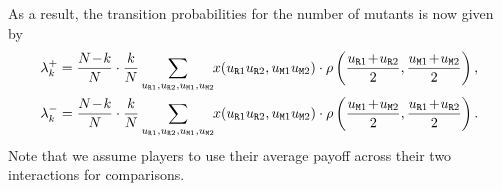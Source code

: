 \documentclass[11pt]{article}
\def\resident{\texttt{R}}
\def\mutant{\texttt{M}}
\theoremstyle{plainCl1}
\theoremstyle{plainCl2}
\begin{document}
\noindent
As a result, the transition probabilities for the number of mutants is now given by
\begin{equation}\label{eq:ratio_TwoInteractions}
\begin{array}{l}
\displaystyle \lambda^+_k=\frac{N\!-\!k}{N}\cdot \frac{k}{N} \sum_{u_{\resident 1},u_{\resident 2},u_{\mutant 1},u_{\mutant 2}} \hspace{-0.1cm} x(u_{\resident 1}u_{\resident 2}, u_{\mutant 1}u_{\mutant 2})\cdot \rho\left(\frac{u_{\resident 1} \!+\! u_{\resident 2}}{2}, \frac{u_{\mutant 1} \!+\! u_{\mutant 2}}{2}\right), \\[0.5cm]
\displaystyle \lambda^-_k=\frac{N\!-\!k}{N}\cdot \frac{k}{N} \sum_{u_{\resident 1},u_{\resident 2},u_{\mutant 1},u_{\mutant 2}} \hspace{-0.1cm} x(u_{\resident 1}u_{\resident 2},u_{\mutant 1}u_{\mutant 2})\cdot \rho\left(\frac{u_{\mutant 1} \!+\! u_{\mutant 2}}{2}, \frac{u_{\resident 1} \!+\! u_{\resident 2}}{2}\right).
\end{array}
\end{equation}
Note that we assume players to use their average payoff across their two interactions for comparisons.\\

\end{document}
